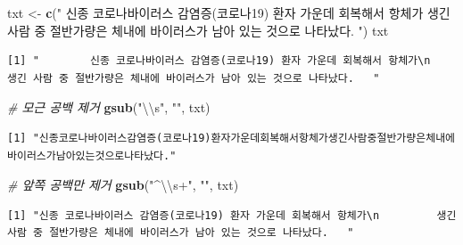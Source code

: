 \documentclass[
  11pt,
]{krantz}
\newenvironment{Shaded}{\begin{snugshade}}{\end{snugshade}}
\newcommand{\CharTok}[1]{\textcolor[rgb]{0.5,0.5,0.5}{#1}}
\newcommand{\CommentTok}[1]{\textcolor[rgb]{0.37,0.37,0.37}{\textit{#1}}}
\newcommand{\KeywordTok}[1]{\textcolor[rgb]{0.27,0.27,0.27}{\textbf{#1}}}
\newcommand{\NormalTok}[1]{#1}
\newcommand{\StringTok}[1]{\textcolor[rgb]{0.5,0.5,0.5}{#1}}
\begin{document}
\footnotesize

\begin{Shaded}
\begin{Highlighting}[]
\NormalTok{txt <-}\StringTok{ }\KeywordTok{c}\NormalTok{(}\StringTok{"        신종 코로나바이러스 감염증(코로나19) 환자 가운데 회복해서 항체가}
\StringTok{         생긴 사람 중 절반가량은 체내에 바이러스가 남아 있는 것으로 나타났다.   "}\NormalTok{)}
\NormalTok{txt}
\end{Highlighting}
\end{Shaded}

\begin{verbatim}
[1] "        신종 코로나바이러스 감염증(코로나19) 환자 가운데 회복해서 항체가\n         생긴 사람 중 절반가량은 체내에 바이러스가 남아 있는 것으로 나타났다.   "
\end{verbatim}

\begin{Shaded}
\begin{Highlighting}[]
\CommentTok{# 모근 공백 제거}
\KeywordTok{gsub}\NormalTok{(}\StringTok{"}\CharTok{\textbackslash{}\textbackslash{}}\StringTok{s"}\NormalTok{, }\StringTok{""}\NormalTok{, txt)}
\end{Highlighting}
\end{Shaded}

\begin{verbatim}
[1] "신종코로나바이러스감염증(코로나19)환자가운데회복해서항체가생긴사람중절반가량은체내에바이러스가남아있는것으로나타났다."
\end{verbatim}

\begin{Shaded}
\begin{Highlighting}[]
\CommentTok{# 앞쪽 공백만 제거}
\KeywordTok{gsub}\NormalTok{(}\StringTok{"^}\CharTok{\textbackslash{}\textbackslash{}}\StringTok{s+"}\NormalTok{, }\StringTok{""}\NormalTok{, txt)}
\end{Highlighting}
\end{Shaded}

\begin{verbatim}
[1] "신종 코로나바이러스 감염증(코로나19) 환자 가운데 회복해서 항체가\n         생긴 사람 중 절반가량은 체내에 바이러스가 남아 있는 것으로 나타났다.   "
\end{verbatim}

\begin{Shaded}
\end{Shaded}
\end{document}
